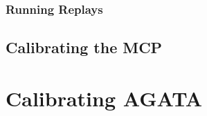 \documentclass{article}
\begin{document}
\subsubsection{Running Replays}




\subsection{Calibrating the MCP}

\pagebreak

\section{Calibrating AGATA}


\printbibliography











\end{document}
